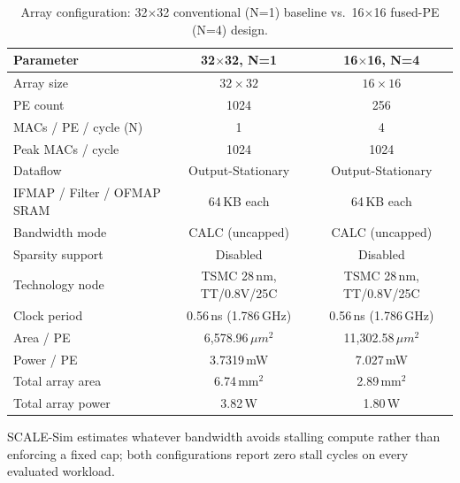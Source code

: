 
\begin{table}[t]
\centering
\begin{threeparttable}
\caption{Array configuration: 32$\times$32 conventional (N=1) baseline vs.\ 16$\times$16 fused-PE (N=4) design.}
\label{tab:config-comparison}
\begin{tabular}{lcc}
\toprule
\textbf{Parameter} & \textbf{32$\times$32, N=1} & \textbf{16$\times$16, N=4} \\
\midrule
Array size              & $32 \times 32$ & $16 \times 16$ \\
PE count                 & 1024           & 256            \\
MACs / PE / cycle (N)    & 1              & 4              \\
Peak MACs / cycle        & 1024           & 1024           \\
Dataflow                 & Output-Stationary & Output-Stationary \\
IFMAP / Filter / OFMAP SRAM & 64\,KB each & 64\,KB each \\
Bandwidth mode            & CALC (uncapped)\tnote{a} & CALC (uncapped)\tnote{a} \\
Sparsity support          & Disabled       & Disabled       \\
Technology node            & TSMC 28\,nm, TT/0.8V/25\textdegree{}C & TSMC 28\,nm, TT/0.8V/25\textdegree{}C \\
Clock period               & 0.56\,ns (1.786\,GHz) & 0.56\,ns (1.786\,GHz) \\
Area / PE                  & 6{,}578.96\,$\mu m^2$ & 11{,}302.58\,$\mu m^2$ \\
Power / PE                  & 3.7319\,mW    & 7.027\,mW      \\
Total array area            & 6.74\,mm$^2$  & 2.89\,mm$^2$   \\
Total array power           & 3.82\,W       & 1.80\,W        \\
\bottomrule
\end{tabular}
\begin{tablenotes}
\footnotesize
\item[a] SCALE-Sim estimates whatever bandwidth avoids stalling compute rather than enforcing a fixed cap; both configurations report zero stall cycles on every evaluated workload.
\end{tablenotes}
\end{threeparttable}
\end{table}


